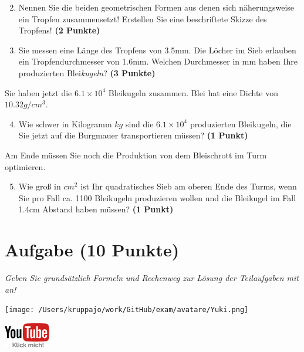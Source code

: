 \documentclass[a4paper, 9pt]{scrartcl}\usepackage[]{graphicx}\usepackage[]{xcolor}
\begin{document}
\begin{enumerate}
  \setcounter{enumi}{1}
\item Nennen Sie die beiden geometrischen Formen aus denen sich näherungsweise ein Tropfen zusammensetzt! Erstellen Sie eine beschriftete Skizze des Tropfens! \textbf{(2 Punkte)}
\item Sie messen eine Länge des Tropfens von 3.5mm. Die Löcher im Sieb erlauben ein Tropfendurchmesser von 1.6mm. Welchen Durchmesser in mm haben Ihre produzierten Blei\textit{kugeln}?  \textbf{(3 Punkte)}
\end{enumerate}

Sie haben jetzt die \ensuremath{6.1\times 10^{4}} Bleikugeln zusammen. Blei hat eine Dichte
von $10.32g/cm^3$.

\begin{enumerate}
  \setcounter{enumi}{3}
\item Wie schwer in Kilogramm $kg$ sind die \ensuremath{6.1\times 10^{4}} produzierten
  Bleikugeln, die Sie jetzt auf die Burgmauer transportieren müssen?
  \textbf{(1 Punkt)}
\end{enumerate}

Am Ende müssen Sie noch die Produktion von dem Bleischrott im Turm optimieren.

\begin{enumerate}
  \setcounter{enumi}{4}
\item Wie gro{\ss} in $cm^2$ ist Ihr quadratisches Sieb am oberen Ende des Turms,
  wenn Sie pro Fall ca. 1100 Bleikugeln produzieren wollen und
  die Bleikugel im Fall 1.4cm Abstand haben müssen?  \textbf{(1
    Punkt)}
\end{enumerate}
 
\clearpage

\section{Aufgabe \hfill (10 Punkte)}

\textit{Geben Sie grundsätzlich Formeln und Rechenweg zur Lösung der Teilaufgaben mit an!} \\[1Ex]
 

 
\begin{minipage}[t]{0.5\textwidth}
\texttt{[image: /Users/kruppajo/work/GitHub/exam/avatare/Yuki.png]}
\end{minipage}
\begin{minipage}[t]{0.5\textwidth}
\hfill
\href{https://youtu.be/Mr6eslls4J0}{\includegraphics[width = 2cm]{img/youtube}}
\end{minipage}
\end{document}
